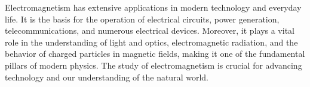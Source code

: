 Electromagnetism has extensive applications in modern technology and everyday life. It is the basis for the operation of electrical circuits, power generation, telecommunications, and numerous electrical devices. Moreover, it plays a vital role in the understanding of light and optics, electromagnetic radiation, and the behavior of charged particles in magnetic fields, making it one of the fundamental pillars of modern physics. The study of electromagnetism is crucial for advancing technology and our understanding of the natural world.